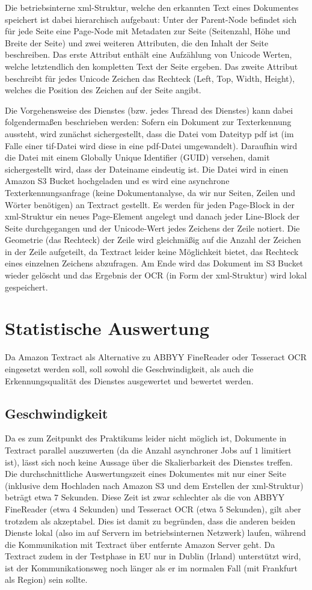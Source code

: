 \documentclass{whswinvcbook}
\begin{document}
Die betriebsinterne xml-Struktur, welche den erkannten Text eines Dokumentes speichert ist dabei hierarchisch aufgebaut: Unter der Parent-Node befindet sich für jede Seite eine Page-Node mit Metadaten zur Seite (Seitenzahl, Höhe und Breite der Seite) und zwei weiteren Attributen, die den Inhalt der Seite beschreiben. Das erste Attribut enthält eine Aufzählung von Unicode Werten, welche letztendlich den kompletten Text der Seite ergeben. Das zweite Attribut beschreibt für jedes Unicode Zeichen das Rechteck (Left, Top, Width, Height), welches die Position des Zeichen auf der Seite angibt.

Die Vorgehensweise des Dienstes (bzw. jedes Thread des Dienstes) kann dabei folgendermaßen beschrieben werden: Sofern ein Dokument zur Texterkennung aussteht, wird zunächst sichergestellt, dass die Datei vom Dateityp pdf ist (im Falle einer tif-Datei wird diese in eine pdf-Datei umgewandelt). Daraufhin wird die Datei mit einem Globally Unique Identifier (GUID) versehen, damit sichergestellt wird, dass der Dateiname eindeutig ist. Die Datei wird in einen Amazon S3 Bucket hochgeladen und es wird eine asynchrone Texterkennungsanfrage (keine Dokumentanalyse, da wir nur Seiten, Zeilen und Wörter benötigen) an Textract gestellt. Es werden für jeden Page-Block in der xml-Struktur ein neues Page-Element angelegt und danach jeder Line-Block der Seite durchgegangen und der Unicode-Wert jedes Zeichens der Zeile notiert. Die Geometrie (das Rechteck) der Zeile wird gleichmäßig auf die Anzahl der Zeichen in der Zeile aufgeteilt, da Textract leider keine Möglichkeit bietet, das Rechteck eines einzelnen Zeichens abzufragen. Am Ende wird das Dokument im S3 Bucket wieder gelöscht und das Ergebnis der OCR (in Form der xml-Struktur) wird lokal gespeichert.
\section{Statistische Auswertung}
Da Amazon Textract als Alternative zu ABBYY FineReader oder Tesseract OCR eingesetzt werden soll, soll sowohl die Geschwindigkeit, als auch die Erkennungsqualität des Dienstes ausgewertet und bewertet werden.
\subsection{Geschwindigkeit}
Da es zum Zeitpunkt des Praktikums leider nicht möglich ist, Dokumente in Textract parallel auszuwerten (da die Anzahl asynchroner Jobs auf $1$ limitiert ist), lässt sich noch keine Aussage über die Skalierbarkeit des Dienstes treffen. Die durchschnittliche Auswertungszeit eines Dokumentes mit nur einer Seite (inklusive dem Hochladen nach Amazon S3 und dem Erstellen der xml-Struktur) beträgt etwa $7$ Sekunden. Diese Zeit ist zwar schlechter als die von ABBYY FineReader (etwa $4$ Sekunden) und Tesseract OCR (etwa $5$ Sekunden), gilt aber trotzdem als akzeptabel. Dies ist damit zu begründen, dass die anderen beiden Dienste lokal (also im auf Servern im betriebsinternen Netzwerk) laufen, während die Kommunikation mit Textract über entfernte Amazon Server geht. Da Textract zudem in der Testphase in EU nur in Dublin (Irland) unterstützt wird, ist der Kommunikationsweg noch länger als er im normalen Fall (mit Frankfurt als Region) sein sollte.
\end{document}
